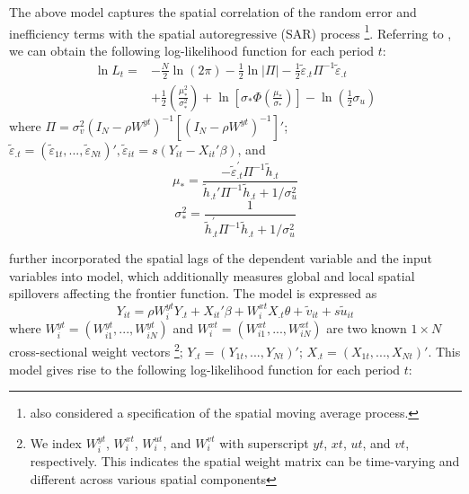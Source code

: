   The above model captures the spatial correlation of  the random error and inefficiency terms with the spatial autoregressive (SAR) process \footnote{\cite{orea2019new} also considered a specification of the spatial moving average process.}.  Referring to \cite{wang2010estimating}, we can obtain the following log-likelihood function for each period $t$:
  \begin{equation}\label{eq5}
 	\begin{aligned}
 		\ln L_{t}= & -\frac{N}{2} \ln (2 \pi)-\frac{1}{2} \ln |\Pi|-\frac{1}{2} \tilde{\varepsilon}_{.t} \Pi^{-1} \tilde{\varepsilon}_{.t} \\
 		& +\frac{1}{2}\left(\frac{\mu_{*}^{2}}{\sigma_{*}^{2}}\right)+\ln \left[\sigma_{*} \Phi\left(\frac{\mu_{*}}{\sigma_{*}}\right)\right]-\ln \left(\frac{1}{2}\sigma_{u} \right)
 	\end{aligned}
 \end{equation}
where $\Pi=\sigma_v^2(I_N-\rho W^{yt})^{-1}[(I_N-\rho W^{yt})^{-1}]'$; $ \tilde{\varepsilon}_{.t} = ( \tilde{\varepsilon}_{1t},..., \tilde{\varepsilon}_{Nt})', \tilde{\varepsilon}_{it}=s(Y_{it}-X_{it}' \beta)$, and 
\begin{equation}
	\mu_*  =\frac{-\tilde{\varepsilon}_{.t}^{\prime} \Pi^{-1} \tilde{h}_{.t}}{\tilde{h}_{.t}' \Pi^{-1} \tilde{h}_{.t}+1 / \sigma_u^2}
\end{equation}
\begin{equation}
	\sigma_*^2  =\frac{1}{\tilde{h}_{.t}^{\prime} \Pi^{-1} \tilde{h}_{.t}+1 / \sigma_u^2}
\end{equation}

 
\cite{galli2022spatial} further incorporated the spatial lags of the dependent variable and the input variables into \cite{orea2019new} model, which additionally measures global and local spatial spillovers affecting the frontier function.  The model is expressed as
\begin{equation}\label{gallimodel}
	Y_{it} = \rho W_{i}^{yt}Y_{.t}+X_{it}'\beta+ W_{i}^{xt}X_{.t} \theta + \tilde{v}_{it}+s\tilde{u}_{it}
\end{equation}
where $W_{i}^{yt}=(W_{i1}^{yt},...,W_{iN}^{yt})$ and $W_{i}^{xt}=(W_{i1}^{xt},...,W_{iN}^{xt})$ are two known $1 \times N$ cross-sectional weight vectors \footnote{We index $W_{i}^{yt}$, $W_{i}^{xt}$, $W_{i}^{ut}$, and $W_{i}^{vt}$ with superscript $yt$, $xt$, $ut$, and $vt$, respectively. This indicates the spatial weight matrix can be time-varying and different across various spatial components}; $Y_{.t} = (Y_{1t},..., Y_{Nt})'$; $X_{.t} = (X_{1t},..., X_{Nt})'$.  This model gives rise to the following log-likelihood function for each period $t$: 

